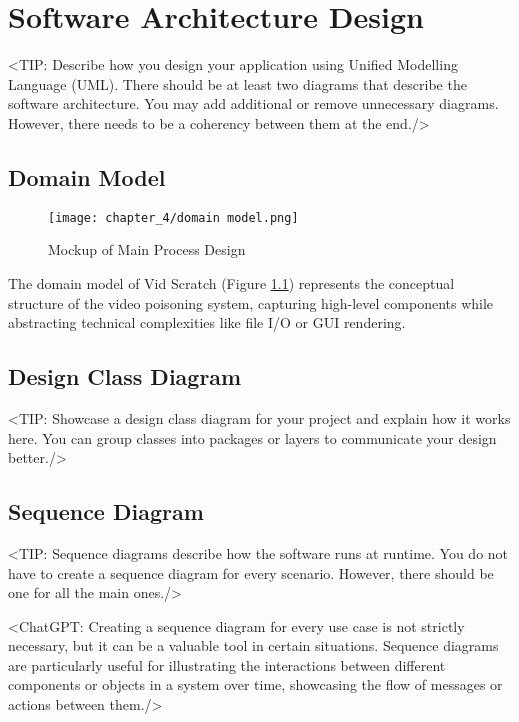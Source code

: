 \chapter{Software Architecture Design}
\label{chap:software-architecture-design}
<TIP: Describe how you design your application using Unified Modelling
Language (UML). There should be at least two diagrams that describe the
software architecture. You may add additional or remove unnecessary diagrams.
However, there needs to be a coherency between them at the end./>

\section{Domain Model}
\label{section:domain-model}

\begin{figure}[h]
    \centering
    \texttt{[image: chapter\_4/domain model.png]}
    \caption{Mockup of Main Process Design}
    \label{fig:domain-model}
\end{figure}

The domain model of Vid Scratch (Figure \ref{fig:domain-model}) represents the conceptual structure of the video poisoning system, capturing high-level components while abstracting technical complexities like file I/O or GUI rendering.

\section{Design Class Diagram}
\label{section:design-class-diagram}
<TIP: Showcase a design class diagram for your project and explain
how it works here. You can group classes into packages or layers to communicate your
design better./>

\section{Sequence Diagram}
\label{section:sequence-diagram}
<TIP: Sequence diagrams describe how the software runs at runtime.
You do not have to create a sequence diagram for every scenario. However,
there should be one for all the main ones./>

<ChatGPT: Creating a sequence diagram for every use case is not
strictly necessary, but it can be a valuable tool in certain situations. Sequence
diagrams are particularly useful for illustrating the interactions between different
components or objects in a system over time, showcasing the flow of messages
or actions between them./>


